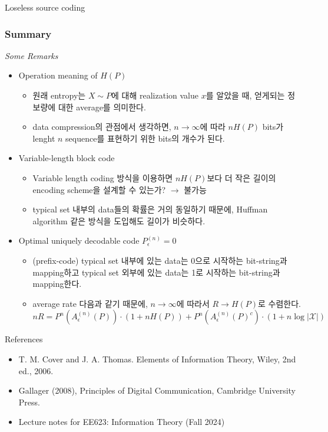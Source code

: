 \documentclass[9pt]{beamer}
\begin{document}
\begin{section}{Loseless source coding}
        \begin{frame}
            \frametitle{Summary}
            \textit{Some Remarks}
            \begin{itemize}
                \item Operation meaning of $H(P)$
                \begin{itemize}
                    \item 원래 entropy는 $X \sim P$에 대해 realization value $x$를 알았을 때, 얻게되는 정보량에 대한 average를 의미한다.
                    \item data compression의 관점에서 생각하면, $n\rightarrow \infty$에 따라 $nH(P)$ bits가 lenght $n$ sequence를 표현하기 위한 bits의 개수가 된다.
                \end{itemize}
                \item Variable-length block code
                \begin{itemize}
                    \item Variable length coding 방식을 이용하면 $nH(P)$보다 더 작은 길이의 encoding scheme을 설계할 수 있는가? $\rightarrow$ 불가능
                    \item typical set 내부의 data들의 확률은 거의 동일하기 때문에, Huffman algorithm 같은 방식을 도입해도 길이가 비슷하다.
                \end{itemize}
                \item Optimal uniquely decodable code $P_\epsilon ^{(n)}=0$
                \begin{itemize}
                    \item (prefix-code)  typical set 내부에 있는 data는 0으로 시작하는 bit-string과 mapping하고 typical set 외부에 있는 data는 1로 시작하는 bit-string과 mapping한다.
                    \item average rate 다음과 같기 때문에, $n\rightarrow \infty$에 따라서 $R\rightarrow H(P)$로 수렴한다.
                    $$ nR = P^n(A_\epsilon^{(n)}(P)) \cdot(1+nH(P)) +  P^n(A_\epsilon^{(n)}(P)^c) \cdot(1+n \log|\mathcal X|) $$
                \end{itemize}
            \end{itemize}
        \end{frame}

    \end{section}

    \begin{frame}{References}
        \begin{itemize}
            \item T. M. Cover and J. A. Thomas. Elements of Information Theory, Wiley, 2nd ed., 2006.
            \item Gallager (2008), Principles of Digital Communication, Cambridge University Press.
            \item Lecture notes for EE623: Information Theory (Fall 2024)
        \end{itemize}
        \vspace{6cm}
    \end{frame}
\end{document}
